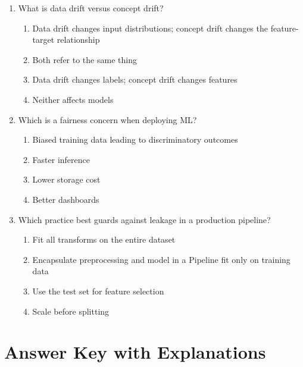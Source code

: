 \documentclass[11pt]{article}
\begin{document}
\begin{enumerate}[leftmargin=*, label=\textbf{Q\arabic*.}, start=89]
		\item What is data drift versus concept drift?
		\begin{enumerate}[label=(\alph*)]
			\item Data drift changes input distributions; concept drift changes the feature-target relationship
			\item Both refer to the same thing
			\item Data drift changes labels; concept drift changes features
			\item Neither affects models
		\end{enumerate}
		
		\item Which is a fairness concern when deploying ML?
		\begin{enumerate}[label=(\alph*)]
			\item Biased training data leading to discriminatory outcomes
			\item Faster inference
			\item Lower storage cost
			\item Better dashboards
		\end{enumerate}
		
		\item Which practice best guards against leakage in a production pipeline?
		\begin{enumerate}[label=(\alph*)]
			\item Fit all transforms on the entire dataset
			\item Encapsulate preprocessing and model in a Pipeline fit only on training data
			\item Use the test set for feature selection
			\item Scale before splitting
		\end{enumerate}
		
	\end{enumerate}
	
	\newpage
	\section{Answer Key with Explanations}
	\label{sec:key}
	
\end{document}
